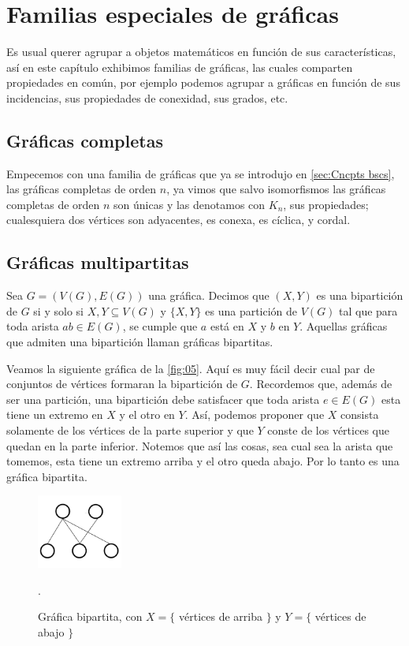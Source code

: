 \section{Familias especiales de gráficas}
\label{sec:Familias especiales de gráficas}

Es usual querer agrupar a objetos matemáticos en función de sus características, así en este capítulo exhibimos familias de gráficas, las cuales comparten propiedades en común, por ejemplo podemos agrupar a gráficas en función de sus incidencias, sus propiedades de conexidad, sus grados, etc. 

\subsection{Gr\'aficas completas}

Empecemos con una familia de gráficas que ya se introdujo en \cref{sec:Cncpts bscs}, las gráficas completas de orden $n$, ya vimos que salvo isomorfismos las gráficas completas de orden $n$ son únicas y las denotamos con $K_n$, sus propiedades; cualesquiera dos vértices son adyacentes, es conexa, es cíclica, y cordal.

\subsection{Gr\'aficas multipartitas}
Sea $G=(V(G), E(G))$ una gráfica. Decimos que $(X,Y)$ es una bipartición de $G$ si y solo si $X,Y \subseteq V(G)$ y $\{X,Y\}$ es una partición de $V(G)$ tal que para toda arista $ab \in E(G)$, se cumple que $a$ est\'a en $X$ y $b$ en $Y$. Aquellas gráficas que admiten una bipartici\'on llaman gráficas bipartitas.


Veamos la siguiente gráfica de la \cref{fig:05}. Aquí es muy fácil decir cual par de conjuntos de vértices formaran la bipartición de $G$. Recordemos que, adem\'as de ser una partici\'on, una bipartici\'on debe satisfacer que toda arista $e \in E(G)$ esta tiene un extremo en $X$ y el otro en $Y$. Así, podemos proponer que $X$ consista solamente de los vértices de la parte superior y que $Y$ conste de los vértices que quedan en la parte inferior. Notemos que así las cosas, sea cual sea la arista que tomemos, esta tiene un extremo arriba y el otro queda abajo. Por lo tanto es una gráfica bipartita.

\begin{figure}[H]
  \centering
  \includegraphics[width=0.25\textwidth]{recursos/capturas/05.jpg}
  \caption{Gráfica bipartita, con $X=\{$ vértices de arriba $\} $ y $Y=\{$ vértices de abajo $\}$} .
  \label{fig:10}
\end{figure}

